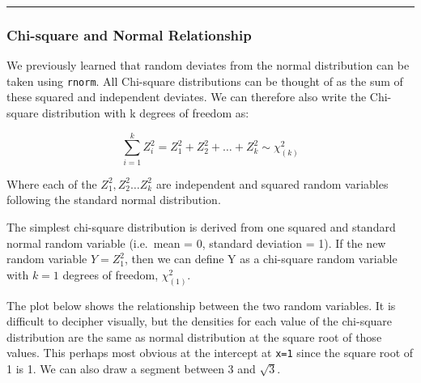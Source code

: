 \documentclass[
]{article}
\begin{document}
\begin{center}\rule{0.5\linewidth}{0.5pt}\end{center}

\hypertarget{chi-square-and-normal-relationship}{%
\subsubsection{Chi-square and Normal Relationship}\label{chi-square-and-normal-relationship}}

We previously learned that random deviates from the normal distribution can be taken using \texttt{rnorm}. All Chi-square distributions can be thought of as the sum of these squared and independent deviates. We can therefore also write the Chi-square distribution with k degrees of freedom as:

\[\sum_{i=1}^{k}Z_i^2 = Z_1^2 + Z^2_2 + \ldots + Z^2_k \sim \chi^2_{(k)}\]

Where each of the \(Z^2_1,Z^2_2\ldots Z^2_k\) are independent and squared random variables following the standard normal distribution.

The simplest chi-square distribution is derived from one squared and standard normal random variable (i.e.~mean = 0, standard deviation = 1). If the new random variable \(Y=Z_1^2\), then we can define Y as a chi-square random variable with \(k=1\) degrees of freedom, \(\chi^2_{(1)}\).

The plot below shows the relationship between the two random variables. It is difficult to decipher visually, but the densities for each value of the chi-square distribution are the same as normal distribution at the square root of those values. This perhaps most obvious at the intercept at \texttt{x=1} since the square root of 1 is 1. We can also draw a segment between 3 and \(\sqrt{3}\).
\end{document}
